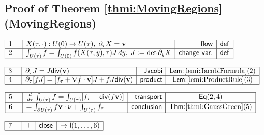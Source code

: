 \documentclass[11pt,reqno]{amsart}
\begin{document}
	\subsection*{Proof of Theorem \protect\ref{thmi:MovingRegions} (\textsf{MovingRegions})}
	\noindent$\begin{array}{|m{0.5cm}|l|r|c|}
	\hline
	1 & X(\tau,\cdot):U(0)\to U(\tau),\;\partial_{\tau}X=\mathbf{v} & \mathsf{flow} & \mathsf{def} \\ \hline
	2 & \int_{U(\tau)}f=\int_{U(0)}f(X(\tau,y),\tau)J\,dy,\;J:=\det\partial_{y}X & \mathsf{change\ var.} & \mathsf{def} \\ \hline
	\end{array}$
	\par\nointerlineskip\noindent$\begin{array}{|m{0.5cm}|l|r|c|}
	\hline
	3 & \partial_{\tau}J=J\mathsf{div}(\mathbf{v}) & \mathsf{Jacobi} & \textsf{Lem:}\ref{lemi:JacobiFormula}(2) \\ \hline
	4 & \partial_{\tau}[fJ]=[f_{\tau}+\nabla f\cdot\mathbf{v}]J+fJ\mathsf{div}(\mathbf{v}) & \mathsf{product} & \textsf{Lem:}\ref{lemi:ProductRule}(3) \\ \hline
	\end{array}$
	\par\nointerlineskip\noindent$\begin{array}{|m{0.5cm}|l|r|c|}
	\hline
	5 & \tfrac{d}{d\tau}\int_{U(\tau)}f=\int_{U(\tau)}[f_{\tau}+\mathsf{div}(f\mathbf{v})] & \mathsf{transport} & \mathsf{Eq}(2,4) \\ \hline
	6 & =\int_{\partial U(\tau)}f\mathbf{v}\cdot\nu+\int_{U(\tau)}f_{\tau} & \mathsf{conclusion} & \textsf{Thm:}\ref{thmi:GaussGreen}(5) \\ \hline
	\end{array}$
	\par\nointerlineskip\noindent$\begin{array}{|m{0.5cm}|l|r|c|}
	\hline
	7 & \top & \mathsf{close} & \to\mathsf{I}(1,\dots,6) \\ \hline
	\end{array}$
	\medskip
	
\end{document}
